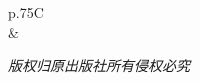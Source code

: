 \begin{changemargin}{8mm}{8mm}

\noindent\begin{tabularx}{\linewidth}{p{.75\linewidth}C}
   \\
\specialrule{1pt}{1pt}{5pt}
\usebox\COPYRIGHT              &   \usebox\TeXlion     \\
\specialrule{1pt}{5pt}{5pt}
\end{tabularx}

\noindent\normalsize\emph*{版权归原出版社所有\hspace{.8\ccwd}侵权必究}\hfill\mbox{}
\end{changemargin}
